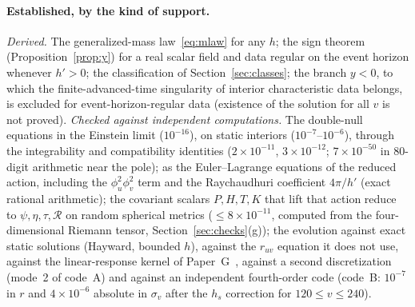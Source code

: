 \documentclass[11pt]{article}
\begin{document}
\paragraph{Established, by the kind of support.}
\emph{Derived.} The generalized-mass law~\eqref{eq:mlaw} for any $h$; the sign theorem (Proposition~\ref{prop:y}) for a real scalar field and data regular on the event horizon whenever $h'>0$; the classification of Section~\ref{sec:classes}; the branch $y<0$, to which the finite-advanced-time singularity of interior characteristic data belongs, is excluded for event-horizon-regular data (existence of the solution for all $v$ is not proved).
\emph{Checked against independent computations.} The double-null equations in the Einstein limit ($10^{-16}$), on static interiors ($10^{-7}$--$10^{-6}$), through the integrability and compatibility identities ($2\times10^{-11}$, $3\times10^{-12}$; $7\times10^{-50}$ in $80$-digit arithmetic near the pole); as the Euler--Lagrange equations of the reduced action, including the $\phi_u^{2}\phi_v^{2}$ term and the Raychaudhuri coefficient $4\pi/h'$ (exact rational arithmetic); the covariant scalars $P,H,T,K$ that lift that action reduce to $\psi,\eta,\tau,\mathcal R$ on random spherical metrics ($\le8\times10^{-11}$, computed from the four-dimensional Riemann tensor, Section~\ref{sec:checks}(g)); the evolution against exact static solutions (Hayward, bounded $h$), against the $r_{uv}$ equation it does not use, against the linear-response kernel of Paper~G~\citep{PaperG}, against a second discretization (mode~2 of code~A) and against an independent fourth-order code (code~B: $10^{-7}$ in $r$ and $4\times10^{-6}$ absolute in $\sigma_v$ after the $h_s$ correction for $120\le v\le240$).
\end{document}

